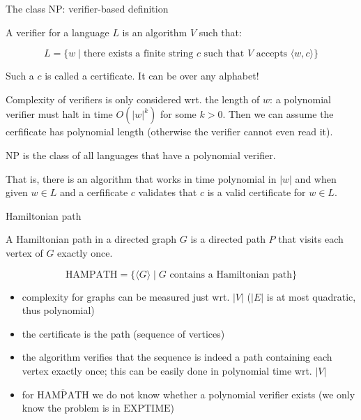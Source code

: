 \documentclass[handout]{beamer}
\begin{document}
    
\begin{frame}{The class NP: verifier-based definition}
    
    \begin{definition}
        A \alert{verifier} for a language $L$ is an algorithm $V$ such that:
        
        \vspace{-24pt}
        $$
        L=\{w\mid \text{there exists a finite string $c$ such that $V$ accepts }\langle w,c\rangle\}
        $$
        \vspace{-24pt}
    \end{definition}
    \vspace{-9pt}
    Such a $c$ is called a \alert{certificate}. It can be over any alphabet!

    Complexity of verifiers is only considered wrt. the length of $w$: a \alert{polynomial verifier} must halt in time $O(|w|^k)$ for some $k>0$. Then we can assume the cerfificate has polynomial length (otherwise the verifier cannot even read it).
    
    \begin{definition}
        \alert{$\mathrm{NP}$} is the class of all languages that have a polynomial verifier.
    \end{definition}
    \vspace{-9pt}
    That is, there is an algorithm that works in time polynomial in $|w|$ and when given $w\in L$ and a cerfificate $c$ validates that $c$ is a valid certificate for $w\in L$.

\end{frame}


\begin{frame}{Hamiltonian path}
    
    A \alert{Hamiltonian path} in a directed graph $G$ is a directed path $P$ that visits each vertex of $G$ exactly once.
    
    $$
    \mathrm{HAMPATH}=\{\langle G\rangle\mid G\text{ contains a Hamiltonian path}\}
    $$

    \begin{itemize}  
        \item complexity for graphs can be measured just wrt. $|V|$ ($|E|$ is at most quadratic, thus polynomial)    
        \item the \alert{certificate} is the path (sequence of vertices)
        \item the algorithm verifies that the sequence is indeed a path containing each vertex exactly once; this can be easily done in polynomial time wrt. $|V|$
        \item for $\overline{\mathrm{HAMPATH}}$ we do not know whether a polynomial verifier exists (we only know the problem is in $\mathrm{EXPTIME}$)
    \end{itemize}

\end{frame}
\end{document}
